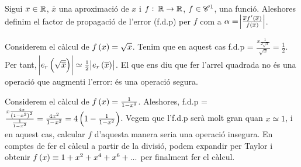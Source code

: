 \begin{defi}
   Sigui $x \in \mathbb{R}$, $\overline{x}$ una aproximació de $x$ i $f:\: \mathbb{R} \to \mathbb{R}$, $f\in \mathscr{C}^1$, una funció. Aleshores definim el factor de propagació de l'error (f.d.p) per $f$ com a $\alpha = \abs{\frac{\overline{x}f'\left(\overline{x}\right)}{f\left(\overline{x}\right)}}$.
\end{defi}

\begin{example}
      Considerem el càlcul de $f\left( x\right)  = \sqrt{x}$. Tenim que en aquest cas f.d.p = $\frac{x\frac{1}{2\sqrt{x}}}{\sqrt{x}} = \frac{1}{2}$. Per tant,  $\abs{e_r\left( \sqrt{\overline{x}}\right)} \simeq \frac{1}{2}\abs{e_r\left( \overline{x}\right)}$. El que ens diu que fer l'arrel quadrada no és una operació que augmenti l'error: és una operació segura.
\end{example}

\begin{example}
      Considerem el càlcul de $f\left( x\right)  = \frac{1}{1-x^2}$. Aleshores, f.d.p = $\frac{x\frac{4x}{\left( 1-x^2\right) ^2}}{\frac{1}{1-x^2}} = \frac{4x^2}{1-x^2} = 4\left( 1 - \frac{1}{1-x^2}\right) $. Vegem que l'f.d.p serà molt gran quan $x \simeq 1$, i en aquest cas, calcular $f$ d'aquesta manera seria una operació insegura. En comptes de fer el càlcul a partir de la divisió, podem expandir per Taylor i obtenir $f\left( x\right)  \equiv 1 + x^2 + x^4 + x^6 + ...$ per finalment fer el càlcul.
\end{example}

